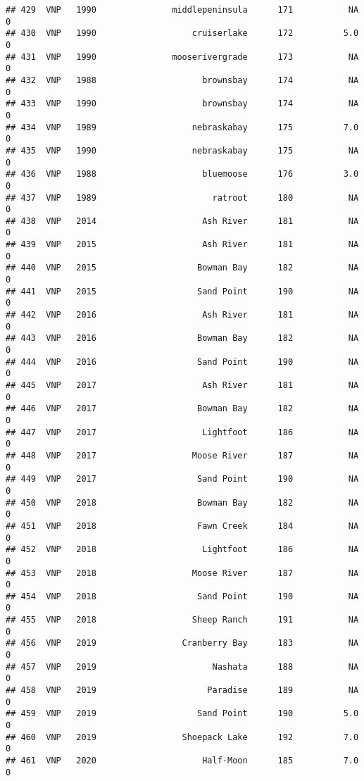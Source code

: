 \documentclass[
]{article}
\begin{document}
\begin{verbatim}
## 429  VNP   1990               middlepeninsula      171           NA       0
## 430  VNP   1990                   cruiserlake      172          5.0       0
## 431  VNP   1990               mooserivergrade      173           NA       0
## 432  VNP   1988                     brownsbay      174           NA       0
## 433  VNP   1990                     brownsbay      174           NA       0
## 434  VNP   1989                   nebraskabay      175          7.0       0
## 435  VNP   1990                   nebraskabay      175           NA       0
## 436  VNP   1988                     bluemoose      176          3.0       0
## 437  VNP   1989                       ratroot      180           NA       0
## 438  VNP   2014                     Ash River      181           NA       0
## 439  VNP   2015                     Ash River      181           NA       0
## 440  VNP   2015                    Bowman Bay      182           NA       0
## 441  VNP   2015                    Sand Point      190           NA       0
## 442  VNP   2016                     Ash River      181           NA       0
## 443  VNP   2016                    Bowman Bay      182           NA       0
## 444  VNP   2016                    Sand Point      190           NA       0
## 445  VNP   2017                     Ash River      181           NA       0
## 446  VNP   2017                    Bowman Bay      182           NA       0
## 447  VNP   2017                     Lightfoot      186           NA       0
## 448  VNP   2017                   Moose River      187           NA       0
## 449  VNP   2017                    Sand Point      190           NA       0
## 450  VNP   2018                    Bowman Bay      182           NA       0
## 451  VNP   2018                    Fawn Creek      184           NA       0
## 452  VNP   2018                     Lightfoot      186           NA       0
## 453  VNP   2018                   Moose River      187           NA       0
## 454  VNP   2018                    Sand Point      190           NA       0
## 455  VNP   2018                   Sheep Ranch      191           NA       0
## 456  VNP   2019                 Cranberry Bay      183           NA       0
## 457  VNP   2019                       Nashata      188           NA       0
## 458  VNP   2019                      Paradise      189           NA       0
## 459  VNP   2019                    Sand Point      190          5.0       0
## 460  VNP   2019                 Shoepack Lake      192          7.0       0
## 461  VNP   2020                     Half-Moon      185          7.0       0

\end{verbatim}
\end{document}
